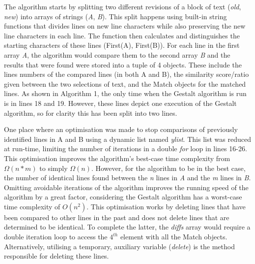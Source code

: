 \newpage
The algorithm starts by splitting two different revisions of a block of text (\textit{old}, \textit{new}) into arrays of strings (\textit{A}, \textit{B}). This split happens using built-in string functions that divides lines on new line characters while also preserving the new line characters in each line. The function then calculates and distinguishes the starting characters of these lines (First(A), First(B)). For each line in the first array \textit{A}, the algorithm would compare them to the second array \textit{B} and the results that were found were stored into a tuple of 4 objects. These include the lines numbers of the compared lines (in both A and B), the similarity score/ratio given between the two selections of text, and the Match objects for the matched lines. As shown in Algorithm 1, the only time when the Gestalt algorithm is run is in lines 18 and 19. However, these lines depict one execution of the Gestalt algorithm, so for clarity this has been split into two lines. 

One place where an optimisation was made to stop comparisons of previously identified lines in A and B using a dynamic list named \textit{ylist}. This list was reduced at run-time, limiting the number of iterations in a double \textit{for} loop in lines 16-26. This optimisation improves the algorithm's best-case time complexity from $\Omega(n*m)$ to simply $\Omega(n)$. However, for the algorithm to be in the best case, the number of identical lines found between the \textit{n} lines in \textit{A} and the \textit{m} lines in \textit{B}. Omitting avoidable iterations of the algorithm improves the running speed of the algorithm by a great factor, considering the Gestalt algorithm has a worst-case time complexity of $O(n^2)$. This optimisation works by deleting lines that have been compared to other lines in the past and does not delete lines that are determined to be identical. To complete the latter, the \textit{diffs} array would require a double iteration loop to access the $4^{th}$ element with all the Match objects. Alternatively, utilising a temporary, auxiliary variable (\textit{delete}) is the method responsible for deleting these lines.

